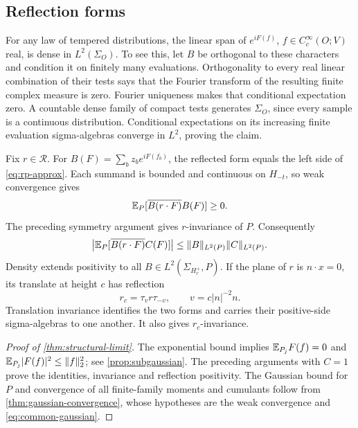 \subsection{Reflection forms}
For any law of tempered distributions, the linear span of
\(e^{iF(f)}\), \(f\in C_c^\infty(O;V)\) real, is dense in
\(L^2(\Sigma_O)\). To see this, let \(B\) be orthogonal to these
characters and condition it on finitely many evaluations.
Orthogonality to every real linear combination of their tests
says that the Fourier transform of the resulting finite complex
measure is zero. Fourier uniqueness makes that conditional
expectation zero. A countable dense family of compact tests
generates \(\Sigma_O\), since every sample is a continuous
distribution. Conditional expectations on its increasing finite
evaluation sigma-algebras converge in \(L^2\), proving the claim.

Fix \(r\in\mathcal R\). For
\(B(F)=\sum_bz_be^{iF(f_b)}\), the reflected form equals
the left side of \eqref{eq:rp-approx}. Each summand is bounded
and continuous on \(H_{-t}\), so weak convergence gives
\[
 \mathbb E_P[\overline{B(r\cdot F)}B(F)]\ge0.
\]
The preceding symmetry argument gives \(r\)-invariance of \(P\).
Consequently
\begin{equation}\label{eq:reflection-form-bound}
 \big|\mathbb E_P[\overline{B(r\cdot F)}C(F)]\big|
 \le\|B\|_{L^2(P)}\|C\|_{L^2(P)}.
\end{equation}
Density extends positivity to all
\(B\in L^2(\Sigma_{H_r^+},P)\).
If the plane of \(r\) is \(n\cdot x=0\), its translate at height
\(c\) has reflection
\[
 r_c=\tau_vr\tau_{-v},\qquad v=c|n|^{-2}n.
\]
Translation invariance identifies the two forms and carries their
positive-side sigma-algebras to one another. It also gives
\(r_c\)-invariance.

\begin{proof}[Proof of \cref{thm:structural-limit}]
The exponential bound implies
\(\mathbb E_{P_j}F(f)=0\) and
\(\mathbb E_{P_j}|F(f)|^2\le\|f\|_2^2\);
see \cref{prop:subgaussian}.
The preceding arguments with \(C=1\) prove the identities,
invariance and reflection positivity.
The Gaussian bound for \(P\) and convergence of all finite-family
moments and cumulants follow from
\cref{thm:gaussian-convergence}, whose hypotheses are
the weak convergence and \eqref{eq:common-gaussian}.
\end{proof}

